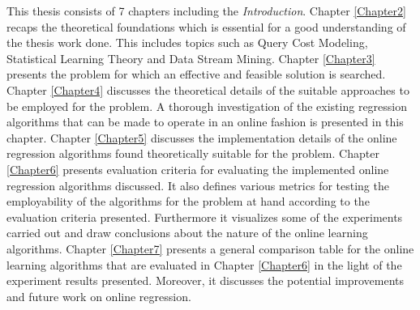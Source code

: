 This thesis consists of 7 chapters including the \textit{Introduction}. Chapter \ref{Chapter2}  recaps the theoretical foundations which is essential for a good understanding of the thesis work done. This includes topics such as Query Cost Modeling, Statistical Learning Theory and Data Stream Mining. Chapter \ref{Chapter3} presents the problem for which an effective and feasible solution is searched. Chapter \ref{Chapter4} discusses the theoretical details of the suitable approaches to be employed for the problem. A thorough investigation of the existing regression algorithms that can be made to operate in an online fashion is presented in this chapter. Chapter \ref{Chapter5} discusses the implementation details of the online regression algorithms found theoretically suitable for the problem. Chapter \ref{Chapter6} presents evaluation criteria for evaluating the implemented online regression algorithms discussed. It also defines various metrics for testing the employability of the algorithms for the problem at hand according to the evaluation criteria presented. Furthermore it visualizes some of the experiments carried out and draw conclusions about the nature of the online learning algorithms. Chapter \ref{Chapter7} presents a general comparison table for the online learning algorithms that are evaluated in Chapter \ref{Chapter6} in the light of the experiment results presented. Moreover, it discusses the potential improvements and future work on online regression.







